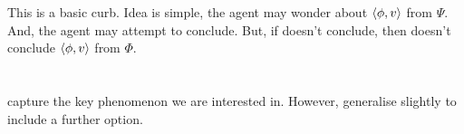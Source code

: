 \begin{note}
  This is a basic curb.
  Idea is simple, the agent may wonder about \(\langle \phi, v \rangle\) from \(\Psi\).
  And, the agent may attempt to conclude.
  But, if doesn't conclude, then doesn't conclude \(\langle \phi, v \rangle\) from \(\Phi\).
\end{note}

\section{}
\label{sec:curb}

\begin{note}
   capture the key phenomenon we are interested in.
  However, generalise slightly to include a further option.
\end{note}

